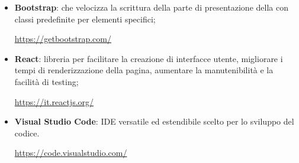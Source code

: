 \begin{itemize}
\begin{center}
	\end{center}
	\item \textbf{Bootstrap}:   che velocizza la scrittura della parte di presentazione della  con classi predefinite per elementi  specifici;
	\begin{center}
		\textcolor{blue}{\url{https://getbootstrap.com/}}
	\end{center}
	\item \textbf{React}: libreria  per facilitare la creazione di interfacce utente, migliorare i tempi di renderizzazione della pagina, aumentare la manutenibilità e la facilità di testing;
	\begin{center}
		\textcolor{blue}{\url{https://it.reactjs.org/}}
	\end{center}
	\item \textbf{Visual Studio Code}: IDE versatile ed estendibile scelto per lo sviluppo del codice.
	\begin{center}
		\textcolor{blue}{\url{https://code.visualstudio.com/}}
	\end{center}
\end{itemize}

